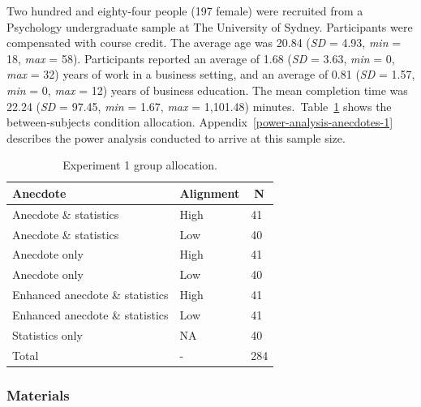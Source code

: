 \documentclass[a4paper, nobind, dvipsnames]{templates/ociamthesis}
\theoremstyle{definition}
\theoremstyle{definition}
\theoremstyle{definition}
\theoremstyle{definition}
\theoremstyle{remark}
\begin{document}
Two hundred and eighty-four people (197 female) were recruited from a Psychology undergraduate sample at The University of Sydney. Participants were compensated with course credit. The average age was 20.84 (\emph{SD} = 4.93, \emph{min} = 18, \emph{max} = 58). Participants reported an average of 1.68 (\emph{SD} = 3.63, \emph{min} = 0, \emph{max} = 32) years of work in a business setting, and an average of 0.81 (\emph{SD} = 1.57, \emph{min} = 0, \emph{max} = 12) years of business education. The mean completion time was 22.24 (\emph{SD} = 97.45, \emph{min} = 1.67, \emph{max} = 1,101.48) minutes.~Table~\ref{tab:condition-allocation-anecdotes-1}
shows the between-subjects condition allocation.
Appendix~\ref{power-analysis-anecdotes-1} describes the power analysis
conducted to arrive at this sample size.

\begin{table}[tbp]

\begin{center}
\begin{threeparttable}

\caption{\label{tab:condition-allocation-anecdotes-1}Experiment 1 group allocation.}

\begin{tabular}{lll}
\toprule
Anecdote & \multicolumn{1}{c}{Alignment} & \multicolumn{1}{c}{N}\\
\midrule
Anecdote \& statistics & High & 41\\
Anecdote \& statistics & Low & 40\\
Anecdote only & High & 41\\
Anecdote only & Low & 40\\
Enhanced anecdote \& statistics & High & 41\\
Enhanced anecdote \& statistics & Low & 41\\
Statistics only & NA & 40\\
Total & - & 284\\
\bottomrule
\end{tabular}

\end{threeparttable}
\end{center}

\end{table}

\hypertarget{materials-anecdotes-1}{%
\subsubsection{Materials}\label{materials-anecdotes-1}}
\end{document}
